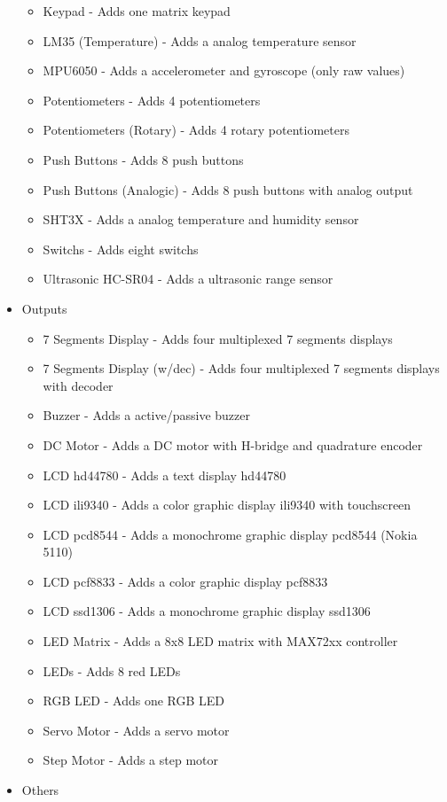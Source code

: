 \begin{itemize}
\begin{itemize}
  \item Keypad -  Adds one matrix keypad
  \item LM35 (Temperature) - Adds a analog temperature sensor
  \item MPU6050 - Adds a accelerometer and gyroscope (only raw values)
  \item Potentiometers - Adds 4 potentiometers
  \item Potentiometers (Rotary) - Adds 4 rotary potentiometers
  \item Push Buttons - Adds 8 push buttons
  \item Push Buttons (Analogic) - Adds 8 push buttons with analog output
  \item SHT3X - Adds a analog temperature and humidity sensor
  \item Switchs - Adds eight switchs
  \item Ultrasonic HC-SR04 - Adds a ultrasonic range sensor
\end{itemize}
 \item{Outputs}
  \begin{itemize}
   \item 7 Segments Display -  Adds four multiplexed 7 segments displays
   \item 7 Segments Display (w/dec) -  Adds four multiplexed 7 segments displays with decoder
   \item Buzzer - Adds a active/passive buzzer
   \item DC Motor - Adds a DC motor with H-bridge and quadrature encoder 
   \item LCD hd44780 - Adds a text display hd44780
   \item LCD ili9340 - Adds a color graphic display ili9340 with touchscreen 
   \item LCD pcd8544 - Adds a monochrome graphic display pcd8544 (Nokia 5110)
   \item LCD pcf8833 - Adds a color graphic display pcf8833
   \item LCD ssd1306 - Adds a monochrome graphic display ssd1306
   \item LED Matrix - Adds a 8x8 LED matrix with MAX72xx controller 
   \item LEDs - Adds 8 red LEDs
   \item RGB LED - Adds one RGB LED 
   \item Servo Motor - Adds a servo motor
   \item Step Motor - Adds a step motor
 \end{itemize}
 \item{Others}

\end{itemize}
